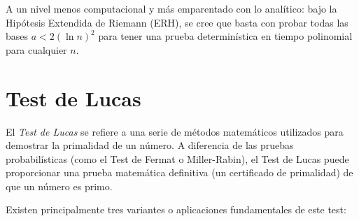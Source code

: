 A un nivel menos computacional y más emparentado con lo analítico: bajo la Hipótesis Extendida de Riemann (ERH), se cree que basta con probar todas las bases $a < 2(\ln n)^2$ para tener una prueba determinística en tiempo polinomial para cualquier $n$.

\section{Test de Lucas}
El \textit{Test de Lucas} se refiere a una serie de métodos matemáticos utilizados para demostrar la primalidad de un número. A diferencia de las pruebas probabilísticas (como el Test de Fermat o Miller-Rabin), el Test de Lucas puede proporcionar una prueba matemática definitiva (un certificado de primalidad) de que un número es primo.

Existen principalmente tres variantes o aplicaciones fundamentales de este test:

